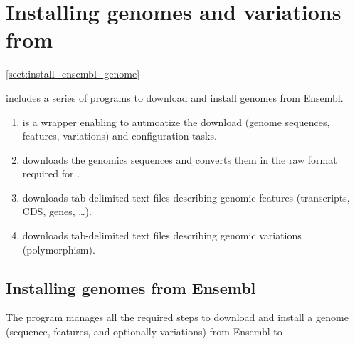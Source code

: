 \section{Installing genomes and variations from \ensembl}
\ref{sect:install_ensembl_genome}

\RSAT includes a series of programs to download and install genomes
from Ensembl.

\begin{enumerate}

\item {} is a wrapper enabling to
  autmoatize the download (genome sequences, features, variations) and
  configuration tasks.

\item {} downloads the genomics
  sequences and converts them in the raw format required for \RSAT.

\item {} downloads tab-delimited text
  files describing genomic features (transcripts, CDS, genes, \ldots).

\item {} downloads tab-delimited
  text files describing genomic variations (polymorphism).

\end{enumerate}

\subsection{Installing genomes from Ensembl}

The program  manages all the required
steps to download and install a genome (sequence, features, and
optionally variations) from Ensembl to \RSAT.

